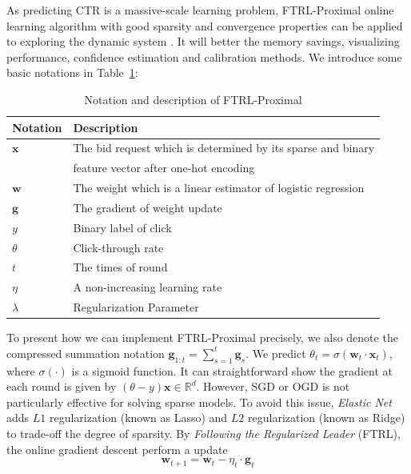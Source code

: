 As predicting CTR is a massive-scale learning problem, FTRL-Proximal online learning algorithm with good sparsity and convergence properties can be applied to exploring the dynamic system \cite{h.brendanmcmahan2011}. It will better the memory savings, visualizing performance, confidence estimation and calibration methods. We introduce some basic notations in Table~\ref{tab:FTRL}:
\begin{table}[H]
\caption{Notation and description of FTRL-Proximal}
\label{tab:FTRL}
\begin{center}
\begin{tabular}{ l l } 
\hline
Notation & Description \\
\hline
$\mathbf{x}$ & The bid request which is determined by its sparse and binary \\
& feature vector after one-hot encoding\\
$\mathbf{w}$ & The weight which is a linear estimator of logistic regression \\
$\mathbf{g}$ & The gradient of weight update \\
$y$ & Binary label of click \\
$\theta$ & Click-through rate \\
$t$ & The times of round \\
$\eta$ & A non-increasing learning rate \\
$\lambda$ & Regularization Parameter \\
\hline
\end{tabular}
\end{center}
\end {table}

To present how we can implement FTRL-Proximal precisely,  we also denote the compressed summation notation $\mathbf{g}_{1:t}=\sum_{s=1}^{t}\mathbf{g}_{s}$. We predict $\theta_t=\sigma(\mathbf{w}_t \cdot \mathbf{x}_t)$, where $\sigma(\cdot)$ is a sigmoid function. It can straightforward show the gradient at each round is given by $(\theta-y)\mathbf{x} \in \mathbb{R}^{d}$. However, SGD or OGD is not particularly effective for solving sparse models. To avoid this issue, \emph{Elastic Net} adds $L1$ regularization (known as Lasso) and $L2$ regularization (known as Ridge) to trade-off the degree of sparsity. By \emph{Following the Regularized Leader} (FTRL), the online gradient descent perform a update
\begin{equation}
\mathbf{w}_{t+1}=\mathbf{w}_{t}-\eta _{t} \cdot \mathbf{g}_{t}
\end{equation}

